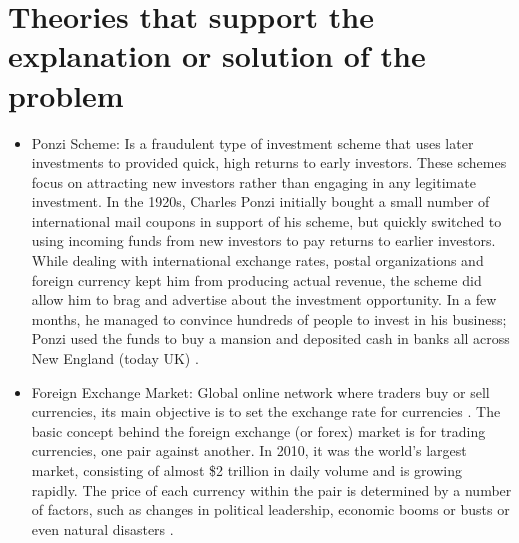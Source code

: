 \section{Theories that support the explanation or solution of the problem}
\begin{itemize}
\item Ponzi Scheme: Is a fraudulent type of investment scheme that uses later investments to provided quick, high returns to early investors. These schemes focus on attracting new investors rather than engaging in any legitimate investment. In the 1920s, Charles Ponzi initially bought a small number of international mail coupons in support of his scheme, but quickly switched to using incoming funds from new investors to pay returns to earlier investors. While dealing with international exchange rates, postal organizations and foreign currency kept him from producing actual revenue, the scheme did allow him to brag and advertise about the investment opportunity. In a few months, he managed to convince hundreds of people to invest in his business; Ponzi used the funds to buy a mansion and deposited cash in banks all across New England (today UK) \cite{ponzi} \cite{ezubao}.

\item Foreign Exchange Market: Global online network where traders buy or sell currencies, its main objective is to set the exchange rate for currencies \cite{foreignExchange}. The basic concept behind the foreign exchange (or forex) market is for trading currencies,
one pair against another. In 2010, it was the world’s largest market, consisting of almost \$2 trillion in daily volume and is growing rapidly. The price of each currency within the pair is determined by a number of factors, such as changes in political leadership, economic booms or busts or even natural disasters \cite{forex}. 


\end{itemize}
